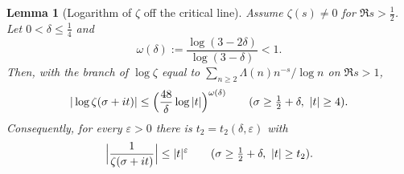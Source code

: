 \documentclass[11pt,reqno]{amsart}
\numberwithin{equation}{section}
\theoremstyle{plain}
\newtheorem{lemma}[theorem]{Lemma}
\theoremstyle{definition}
\theoremstyle{remark}
\newcommand{\eps}{\varepsilon}
\begin{document}
\begin{lemma}[Logarithm of $\zeta$ off the critical line]\label{lem:log-zeta}
Assume $\zeta(s)\ne0$ for $\Re s>\tfrac12$.  Let $0<\delta\le\tfrac14$ and
\begin{equation}\label{eq:three-circles-exponent}
 \omega(\delta):=\frac{\log(3-2\delta)}{\log(3-\delta)}<1 .
\end{equation}
Then, with the branch of $\log\zeta$ equal to $\sum_{n\ge2}\Lambda(n)n^{-s}/\log n$ on $\Re s>1$,
\begin{equation}\label{eq:log-zeta-bound}
 |\log\zeta(\sigma+it)|\le\Bigl(\frac{48}\delta\log|t|\Bigr)^{\omega(\delta)}\qquad(\sigma\ge\tfrac12+\delta,\ |t|\ge4).
\end{equation}
Consequently, for every $\eps>0$ there is $t_2=t_2(\delta,\eps)$ with
\begin{equation}\label{eq:inv-zeta-bound}
 \Bigl|\frac1{\zeta(\sigma+it)}\Bigr|\le|t|^{\eps}\qquad(\sigma\ge\tfrac12+\delta,\ |t|\ge t_2).
\end{equation}
\end{lemma}
\end{document}
